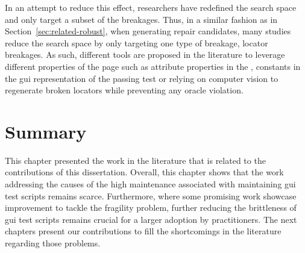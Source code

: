 In an attempt to reduce this effect, researchers have redefined the search space and only target a subset of the breakages. Thus, in a similar fashion as in Section~\ref{sec:related-robust}, when generating repair candidates, many studies reduce the search space by only targeting one type of breakage, locator breakages. As such, different tools are proposed in the literature to leverage different properties of the page such as attribute properties in the \cite{Choudhary2011}, constants in the \gls{gui} representation of the passing test \cite{Eladawy2018, Kirinuki2019} or relying on computer vision\cite{Stocco2018} to regenerate broken locators while preventing any oracle violation.

\section{Summary}
\label{sec:related-summary}

This chapter presented the work in the literature that is related to the contributions of this dissertation. Overall, this chapter shows that the work addressing the causes of the high maintenance associated with maintaining \gls{gui} test scripts remains scarce. Furthermore, where some promising work showcase improvement to tackle the fragility problem, further reducing the brittleness of \gls{gui} test scripts remains crucial for a larger adoption by practitioners. The next chapters present our contributions to fill the shortcomings in the literature regarding those problems.